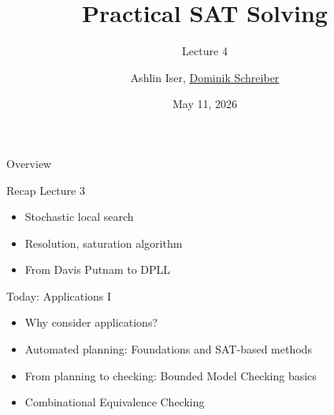 \documentclass[t,english]{sdqbeamer}
\title{Practical SAT Solving}
\subtitle{Lecture 4 \unimp{\normalfont -- Application Highlights}}
\author{{Ashlin Iser}, \underline{Dominik Schreiber}}
\date{May 11, 2026}
\begin{document}
\begin{frame}[title white horizontal, picture=logos/blender-render, kitlogo=rgb]
	\titlepage
\end{frame}

\begin{frame}{Overview}
	\begin{block}{Recap Lecture 3}
		\begin{itemize}
			\item Stochastic local search
			\item Resolution, saturation algorithm
			\item From Davis Putnam to DPLL
		\end{itemize}
	\end{block}
	\begin{blueblock}{Today: Applications I}
		\begin{itemize}
			\item Why consider applications?
			\item Automated planning: Foundations and SAT-based methods
			\item From planning to checking: Bounded Model Checking basics
			\item Combinational Equivalence Checking
			
		\end{itemize}
	\end{blueblock}
\end{frame}
\end{document}
